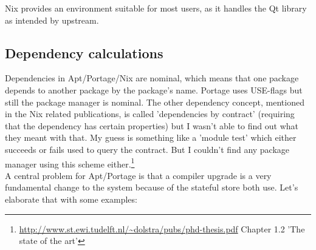 \documentclass[a4paper,10pt]{article}
\begin{document}

Nix provides an environment suitable for most users, as it handles the Qt library as intended by upstream.

















\subsection{Dependency calculations}
Dependencies in Apt/Portage/Nix are nominal, which means that one package depends to another package by the package's name. Portage uses USE-flags but still the package manager is nominal. The other dependency concept, mentioned in the Nix related publications, is called 'dependencies by contract' (requiring that the dependency has certain properties) but I wasn't able to find out what they meant with that. My guess is something like a 'module test' which either succeeds or fails used to query the contract. But I couldn't find any package manager using this scheme either.\footnote{\url{http://www.st.ewi.tudelft.nl/~dolstra/pubs/phd-thesis.pdf} Chapter 1.2 'The state of the art'}\\

A central problem for Apt/Portage is that a compiler upgrade is a very fundamental change to the system because of the stateful store both use. Let's elaborate that with some examples:
\end{document}
